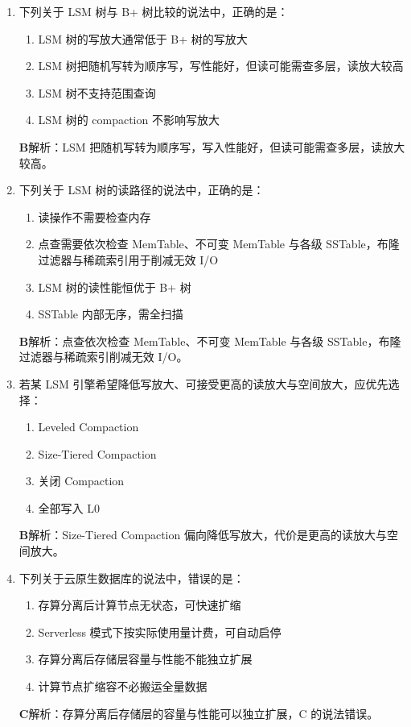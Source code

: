 \documentclass[UTF8,a4paper,11pt]{ctexart}
\newenvironment{answer}%
  {\begin{ans}\noindent{\bfseries\color{ansframe}【答案】}\hspace{0.4em}}%
  {\end{ans}}
\begin{document}
\begin{enumerate}
\item 下列关于 LSM 树与 B+ 树比较的说法中，正确的是：
\begin{enumerate}[label=\Alph*., leftmargin=2.2em, itemsep=1pt]
\item LSM 树的写放大通常低于 B+ 树的写放大
\item LSM 树把随机写转为顺序写，写性能好，但读可能需查多层，读放大较高
\item LSM 树不支持范围查询
\item LSM 树的 compaction 不影响写放大
\end{enumerate}
\begin{answer}
\textbf{B}\quad 解析：LSM 把随机写转为顺序写，写入性能好，但读可能需查多层，读放大较高。
\end{answer}

\item 下列关于 LSM 树的读路径的说法中，正确的是：
\begin{enumerate}[label=\Alph*., leftmargin=2.2em, itemsep=1pt]
\item 读操作不需要检查内存
\item 点查需要依次检查 MemTable、不可变 MemTable 与各级 SSTable，布隆过滤器与稀疏索引用于削减无效 I/O
\item LSM 树的读性能恒优于 B+ 树
\item SSTable 内部无序，需全扫描
\end{enumerate}
\begin{answer}
\textbf{B}\quad 解析：点查依次检查 MemTable、不可变 MemTable 与各级 SSTable，布隆过滤器与稀疏索引削减无效 I/O。
\end{answer}

\item 若某 LSM 引擎希望降低写放大、可接受更高的读放大与空间放大，应优先选择：
\begin{enumerate}[label=\Alph*., leftmargin=2.2em, itemsep=1pt]
\item Leveled Compaction
\item Size-Tiered Compaction
\item 关闭 Compaction
\item 全部写入 L0
\end{enumerate}
\begin{answer}
\textbf{B}\quad 解析：Size-Tiered Compaction 偏向降低写放大，代价是更高的读放大与空间放大。
\end{answer}

\item 下列关于云原生数据库的说法中，错误的是：
\begin{enumerate}[label=\Alph*., leftmargin=2.2em, itemsep=1pt]
\item 存算分离后计算节点无状态，可快速扩缩
\item Serverless 模式下按实际使用量计费，可自动启停
\item 存算分离后存储层容量与性能不能独立扩展
\item 计算节点扩缩容不必搬运全量数据
\end{enumerate}
\begin{answer}
\textbf{C}\quad 解析：存算分离后存储层的容量与性能可以独立扩展，C 的说法错误。
\end{answer}


\end{enumerate}
\end{document}
